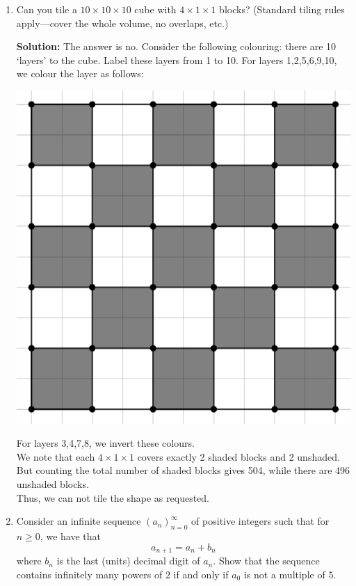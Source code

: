 \documentclass{article}
\begin{document}
\begin{enumerate}[itemsep=\fill]
\item %
Can you tile a $10\times 10\times 10$ cube with $4\times 1\times 1$ blocks? (Standard tiling rules apply---cover the whole volume, no overlaps, etc.)

\textbf{Solution:} The answer is no. Consider the following colouring: there are 10 `layers' to the cube. Label these layers from 1 to 10. For layers 1,2,5,6,9,10, we colour the layer as follows:
\begin{center}
\includegraphics[scale=0.5]{Capture.png}
\end{center}
For layers 3,4,7,8, we invert these colours.\\
We note that each $4\times 1\times 1$ covers exactly 2 shaded blocks and 2 unshaded.\\
But counting the total number of shaded blocks gives 504, while there are 496 unshaded blocks.\\
Thus, we can not tile the shape as requested. 


\item %
Consider an infinite sequence $(a_n)_{n=0}^{\infty}$ of positive integers such that for $n \geq 0$, we have that
\[
    a_{n + 1} = a_n + b_n
\]
where $b_n$ is the last (units) decimal digit of $a_n$. Show that the sequence contains infinitely many powers of $2$ if and only if $a_0$ is not a multiple of $5$.


\end{enumerate}
\end{document}
